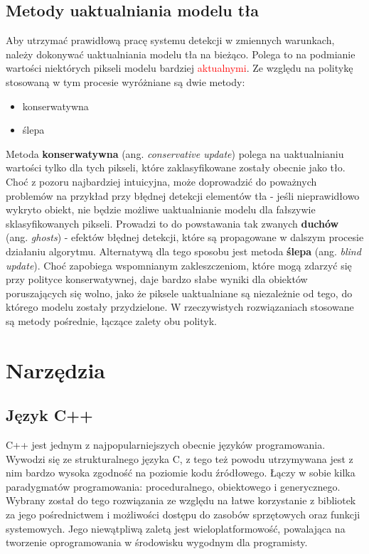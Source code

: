 \subsection{Metody uaktualniania modelu tła}
Aby utrzymać prawidłową pracę systemu detekcji w zmiennych warunkach, należy dokonywać uaktualniania modelu tła na bieżąco. Polega to na podmianie wartości niektórych pikseli modelu bardziej \textcolor{red}{aktualnymi}. Ze względu na politykę stosowaną w tym procesie wyróżniane są dwie metody:
\begin{itemize}
\item konserwatywna
\item ślepa
\end{itemize} 
Metoda \textbf{konserwatywna} (ang. \textit{conservative update}) polega na uaktualnianiu wartości tylko dla tych pikseli, które zaklasyfikowane zostały obecnie jako tło. Choć z pozoru najbardziej intuicyjna, może doprowadzić do poważnych problemów na przykład przy błędnej detekcji elementów tła - jeśli nieprawidłowo wykryto obiekt, nie będzie możliwe uaktualnianie modelu dla fałszywie sklasyfikowanych pikseli. Prowadzi to do powstawania tak zwanych \textbf{duchów} (ang. \textit{ghosts}) - efektów błędnej detekcji, które są propagowane w dalszym procesie działaniu algorytmu. Alternatywą dla tego sposobu jest metoda \textbf{ślepa} (ang. \textit{blind update}). Choć zapobiega wspomnianym zakleszczeniom, które mogą zdarzyć się przy polityce konserwatywnej, daje bardzo słabe wyniki dla obiektów poruszających się wolno, jako że piksele uaktualniane są niezależnie od tego, do którego modelu zostały przydzielone. W rzeczywistych rozwiązaniach stosowane są metody pośrednie, łączące zalety obu polityk.

\section{Narzędzia}
\subsection{Język C++}
C++ jest jednym z najpopularniejszych obecnie języków programowania. Wywodzi się ze strukturalnego języka C, z tego też powodu utrzymywana jest z nim bardzo wysoka zgodność na poziomie kodu źródłowego. Łączy w sobie kilka paradygmatów programowania: proceduralnego, obiektowego i generycznego. Wybrany został do tego rozwiązania ze względu na łatwe korzystanie z bibliotek za jego pośrednictwem i możliwości dostępu do zasobów sprzętowych oraz funkcji systemowych. Jego niewątpliwą zaletą jest wieloplatformowość, powalająca na tworzenie oprogramowania w środowisku wygodnym dla programisty.
